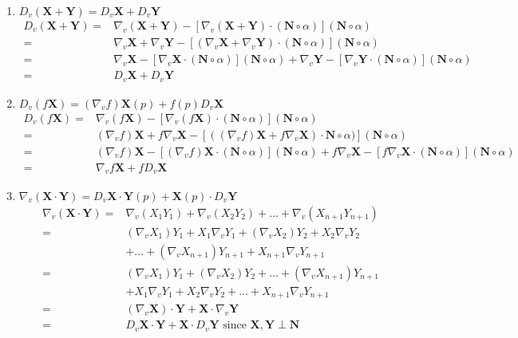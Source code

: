 \begin{enumerate}
	\item $D_v (\mathbf{X} + \mathbf{Y}) = D_v \mathbf{X} + D_v \mathbf{Y}$
	\begin{align*}
		D_v (\mathbf{X} + \mathbf{Y}) = & \nabla_v (\mathbf{X} + \mathbf{Y}) - \left[ \nabla_v (\mathbf{X}+\mathbf{Y}) \cdot (\mathbf{N} \circ \alpha) \right] (\mathbf{N} \circ \alpha) \\
		= & \nabla_v \mathbf{X} + \nabla_v \mathbf{Y} - \left[ (\nabla_v \mathbf{X} + \nabla_v \mathbf{Y}) \cdot (\mathbf{N} \circ \alpha) \right] (\mathbf{N} \circ \alpha) \\
		= & \nabla_v \mathbf{X} - \left[ \nabla_v \mathbf{X} \cdot (\mathbf{N} \circ \alpha) \right] (\mathbf{N} \circ \alpha) +  \nabla_v \mathbf{Y} - \left[ \nabla_v \mathbf{Y} \cdot (\mathbf{N} \circ \alpha) \right] (\mathbf{N} \circ \alpha)  \\
		= & D_v \mathbf{X} + D_v \mathbf{Y}
	\end{align*}
	\item $D_v (f\mathbf{X}) = (\nabla_v f)\mathbf{X}(p) + f(p) D_v \mathbf{X}$ 
	\begin{align*}
		D_v(f\mathbf{X}) = & \nabla_v (f\mathbf{X}) - \left[ \nabla_v (f\mathbf{X}) \cdot (\mathbf{N} \circ \alpha) \right] (\mathbf{N} \circ \alpha) \\
		= & (\nabla_v f) \mathbf{X} + f\nabla_v \mathbf{X} - \left[ ((\nabla_v f) \mathbf{X} + f\nabla_v \mathbf{X}) \cdot \mathbf{N} \circ \alpha) \right] (\mathbf{N} \circ \alpha) \\
		= & (\nabla_v f) \mathbf{X} - \left[ (\nabla_v f)\mathbf{X} \cdot (\mathbf{N} \circ \alpha) \right] (\mathbf{N} \circ \alpha) + f \nabla_v \mathbf{X} - \left[ f\nabla_v\mathbf{X} \cdot (\mathbf{N} \circ \alpha) \right] (\mathbf{N} \circ \alpha) \\
		= & \nabla_v f \mathbf{X} + f D_v \mathbf{X}
	\end{align*}
	\item $\nabla_v (\mathbf{X} \cdot \mathbf{Y}) = D_v \mathbf{X} \cdot \mathbf{Y}(p) + \mathbf{X}(p) \cdot D_v \mathbf{Y} $
	\begin{align*}
		\nabla_v(\mathbf{X} \cdot \mathbf{Y}) = & \nabla_v (X_1Y_1) + \nabla_v (X_2Y_2) + \dots + \nabla_v (X_{n+1}Y_{n+1}) \\
		= & (\nabla_v X_1)Y_1 + X_1\nabla_v Y_1 + (\nabla_v X_2)Y_2 + X_2\nabla_v Y_2 \\ 
		& + \dots + (\nabla_v X_{n+1})Y_{n+1} + X_{n+1}\nabla_v Y_{n+1} \\
		= & (\nabla_v X_1)Y_1 + (\nabla_v X_2)Y_2+ \dots + (\nabla_v X_{n+1})Y_{n+1} \\
		& + X_1\nabla_v Y_1 + X_2 \nabla_v Y_2 + \dots + X_{n+1} \nabla_v Y_{n+1} \\
		= &  (\nabla_v \mathbf{X}) \cdot \mathbf{Y} + \mathbf{X} \cdot \nabla_v \mathbf{Y} \\
		= & D_v \mathbf{X} \cdot \mathbf{Y} + \mathbf{X} \cdot D_v \mathbf{Y} \text{ since } \mathbf{X},\mathbf{Y} \perp \mathbf{N}
	\end{align*}
\end{enumerate}

